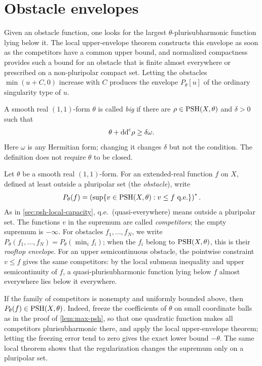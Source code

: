 \section{Obstacle envelopes}
\label{sec:obstacle-envelopes}

Given an obstacle function, one looks for the largest $\theta$-plurisubharmonic function lying below it. The local upper-envelope theorem constructs this envelope as soon as the competitors have a common upper bound, and normalized compactness provides such a bound for an obstacle that is finite almost everywhere or prescribed on a non-pluripolar compact set. Letting the obstacles $\min(u+C,0)$ increase with $C$ produces the envelope $P_\theta[u]$ of the ordinary singularity type of $u$.

A smooth real $(1,1)$-form $\theta$ is called \emph{big} if there are $\rho\in\mathrm{PSH}(X,\theta)$ and $\delta>0$ such that
\[
 \theta+\mathrm{dd}^{\mathrm{c}}\rho\geq\delta\omega.
\]
Here $\omega$ is any Hermitian form; changing it changes $\delta$ but not the condition. The definition does not require $\theta$ to be closed.

Let $\theta$ be a smooth real $(1,1)$-form. For an extended-real function $f$ on $X$, defined at least outside a pluripolar set (the \emph{obstacle}), write
\[
 P_\theta(f)=\left(\sup\{v\in\mathrm{PSH}(X,\theta):v\leq f
                      \ \hbox{q.e.}\}\right)^*.
\]
As in \cref{sec:psh-local-capacity}, q.e.\ (quasi-everywhere) means outside a pluripolar set. The functions $v$ in the supremum are called \emph{competitors}; the empty supremum is $-\infty$. For obstacles $f_1,\ldots,f_N$, we write $P_\theta(f_1,\ldots,f_N)=P_\theta(\min_if_i)$; when the $f_i$ belong to $\mathrm{PSH}(X,\theta)$, this is their \emph{rooftop envelope}. For an upper semicontinuous obstacle, the pointwise constraint $v\leq f$ gives the same competitors: by the local submean inequality and upper semicontinuity of $f$, a quasi-plurisubharmonic function lying below $f$ almost everywhere lies below it everywhere.

If the family of competitors is nonempty and uniformly bounded above, then $P_\theta(f)\in\mathrm{PSH}(X,\theta)$. Indeed, freeze the coefficients of $\theta$ on small coordinate balls as in the proof of \cref{lem:max-psh}, so that one quadratic function makes all competitors plurisubharmonic there, and apply the local upper-envelope theorem; letting the freezing error tend to zero gives the exact lower bound $-\theta$. The same local theorem shows that the regularization changes the supremum only on a pluripolar set.

